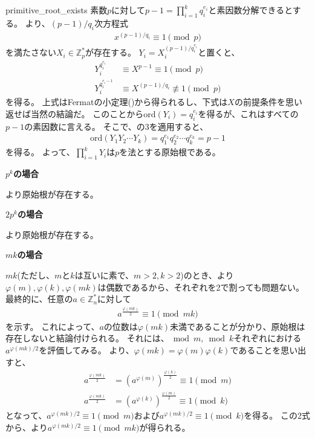 \begin{prProof}{primitive_root_exists}
素数$p$に対して$p-1=\prod_{i=1}^kq_i^{e_i}$と素因数分解できるとする。
より、$(p-1)/q_i$次方程式
\begin{align*}
x^{(p-1)/q_i} \equiv 1 \pmod{p}
\end{align*}
を満たさない$X_i\in\mathbb{Z}_p^*$が存在する。
$Y_i=X_i^{(p-1)/q_i^{e_i}}$と置くと、
\begin{align*}
Y_i^{q_i^{e_i}} &\equiv X^{p-1} \equiv 1 \pmod{p}\\
Y_i^{q_i^{e_i-1}} &\equiv X^{(p-1)/q_i} \not\equiv 1 \pmod{p}
\end{align*}
を得る。
上式はFermatの小定理()から得られるし、下式は$X$の前提条件を思い返せば当然の結論だ。
このことから$\mbox{ord}(Y_i)=q_i^{e_i}$を得るが、これはすべての$p-1$の素因数に言える。
そこで、の3を適用すると、
\begin{align*}
\mbox{ord}(Y_1Y_2\cdots Y_k) = q_1^{e_1}q_2^{e_2} \cdots q_k^{e_k} = p-1
\end{align*}
を得る。
よって、$\prod_{i=1}^k Y_i$は$p$を法とする原始根である。

\noindent\textbf{$p^k$の場合}

より原始根が存在する。

\noindent\textbf{$2p^k$の場合}

より原始根が存在する。

\noindent\textbf{$mk$の場合}

$mk$(ただし、$m$と$k$は互いに素で、$m>2, k>2$)のとき、より$\varphi(m),\varphi(k),\varphi(mk)$は偶数であるから、それぞれを2で割っても問題ない。
最終的に、任意の$a\in\mathbb{Z}_n^*$に対して
\begin{align*}
a^{\frac{\varphi(mk)}{2}} \equiv 1 \pmod{mk}
\end{align*}
を示す。
これによって、$a$の位数は$\varphi(mk)$未満であることが分かり、原始根は存在しないと結論付けられる。
それには、$\bmod{m},\bmod{k}$それぞれにおける$a^{\varphi(mk)/2}$を評価してみる。
より、$\varphi(mk)=\varphi(m)\varphi(k)$であることを思い出すと、
\begin{align*}
a^{\frac{\varphi(mk)}{2}} &= (a^{\varphi(m)})^{\frac{\varphi(k)}{2}} \equiv 1 \pmod{m}\\
a^{\frac{\varphi(mk)}{2}} &= (a^{\varphi(k)})^{\frac{\varphi(m)}{2}} \equiv 1 \pmod{k}
\end{align*}
となって、$a^{\varphi(mk)/2}\equiv1\pmod{m}$および$a^{\varphi(mk)/2}\equiv1\pmod{k}$を得る。
この2式から、より$a^{\varphi(mk)/2} \equiv 1 \pmod{mk}$が得られる。
\end{prProof}
